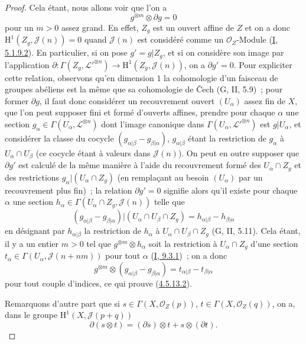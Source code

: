 \begin{proof}
Cela étant, nous allons voir que l'on a
\begin{equation}
\label{II.4.5.13.2-fr}
  g^{\otimes m}\otimes\partial g=0
\tag{4.5.13.2}
\end{equation}
pour un $m>0$ assez grand. En effet, $Z_g$ est un ouvert affine de $Z$ et
on a donc $\mathrm{H}^1(Z_g,\mathcal{J}(n))=0$ quand $\mathcal{J}(n)$ est
considéré comme un $\mathcal{O}_Z$-Module
(\hyperref[I.5.1.9.2-fr]{I, 5.1.9.2}). En particulier, si on pose
$g'=g|Z_g$, et si on considère son image par l'application
$\partial:\Gamma(Z_g,\mathcal{L}'^{\otimes n})\to
\mathrm{H}^1(Z_g,\mathcal{J}(n))$, on a $\partial g'=0$. Pour expliciter
cette relation, observons qu'en dimension $1$ la cohomologie d'un faisceau
de groupes abéliens est la même que sa cohomologie de Čech (G, II, 5.9)~;
pour former $\partial g$, il faut donc considérer un recouvrement ouvert
$(U_\alpha)$ assez fin de $X$, que l'on peut supposer fini et formé
d'ouverts affines, prendre pour chaque $\alpha$ une section
$g_\alpha\in\Gamma(U_\alpha,\mathcal{L}^{\otimes n})$ dont l'image
canonique dans $\Gamma(U_\alpha,\mathcal{L}'^{\otimes n})$ est
$g|U_\alpha$, et considérer la classe du cocycle
$(g_{\alpha|\beta}-g_{\beta|\alpha})$, $g_{\alpha|\beta}$ étant la
restriction de $g_\alpha$ à $U_\alpha\cap U_\beta$ (ce cocycle étant à
valeurs dans $\mathcal{J}(n)$). On peut en outre supposer que $\partial g'$
est calculé de la même manière à l'aide du recouvrement formé des
$U_\alpha\cap Z_g$ et des restrictions $g_\alpha|(U_\alpha\cap Z_g)$ (en
remplaçant au besoin $(U_\alpha)$ par un recouvrement plus fin)~; la
relation $\partial g'=0$ signifie alors qu'il existe pour chaque $\alpha$
une section $h_\alpha\in\Gamma(U_\alpha\cap Z_g,\mathcal{J}(n))$ telle que
\[
  (g_{\alpha|\beta}-g_{\beta|\alpha})
  |(U_\alpha\cap U_\beta\cap Z_g)
  =h_{\alpha|\beta}-h_{\beta|\alpha}
\]
en désignant par $h_{\alpha|\beta}$ la restriction de $h_\alpha$ à
$U_\alpha\cap U_\beta\cap Z_g$ (G, II, 5.11). Cela étant, il y a un entier
$m>0$ tel que $g^{\otimes m}\otimes h_\alpha$ soit la restriction à
$U_\alpha\cap Z_g$ d'une section
$t_\alpha\in\Gamma(U_\alpha,\mathcal{J}(n+nm))$ pour tout $\alpha$
(\hyperref[I.9.3.1-fr]{I, 9.3.1})~; on a donc
\[
  g^{\otimes m}\otimes(g_{\alpha|\beta}-g_{\beta|\alpha})
  =t_{\alpha|\beta}-t_{\beta|\alpha}
\]
pour tout couple d'indices, ce qui prouve
(\hyperref[II.4.5.13.2-fr]{4.5.13.2}).

Remarquons d'autre part que si
$s\in\Gamma(X,\mathcal{O}_Z(p))$,
$t\in\Gamma(X,\mathcal{O}_Z(q))$, on a, dans le groupe
$\mathrm{H}^1(X,\mathcal{J}(p+q))$
\begin{equation}
\label{II.4.5.13.3-fr}
  \partial(s\otimes t)=(\partial s)\otimes t+s\otimes(\partial t).
\tag{4.5.13.3}
\end{equation}


\end{proof}
